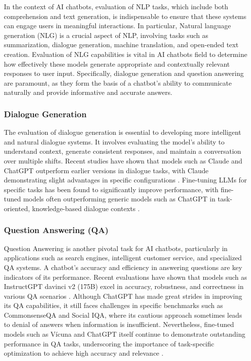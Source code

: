 In the context of AI chatbots, evaluation of NLP tasks, which include both comprehension and text generation, is indispensable to ensure that these systems can engage users in meaningful interactions. In particular, Natural language generation (NLG) is a crucial aspect of NLP, involving tasks such as summarization, dialogue generation, machine translation, and open-ended text creation. Evaluation of NLG capabilities is vital in AI chatbots field to determine how effectively these models generate appropriate and contextually relevant responses to user input. Specifically, dialogue generation and question answering are paramount, as they form the basis of a chatbot's ability to communicate naturally and provide informative and accurate answers.

\subsubsection{Dialogue Generation}

The evaluation of dialogue generation is essential to developing more intelligent and natural dialogue systems. It involves evaluating the model's ability to understand context, generate consistent responses, and maintain a conversation over multiple shifts. Recent studies have shown that models such as Claude and ChatGPT outperform earlier versions in dialogue tasks, with Claude demonstrating slight advantages in specific configurations \cite{lin2023llm, qin2023chatgpt}. Fine-tuning LLMs for specific tasks has been found to significantly improve performance, with fine-tuned models often outperforming generic models such as ChatGPT in task-oriented, knowledge-based dialogue contexts \cite{bang2023multitask}.

\subsubsection{Question Answering (QA)}

Question Answering is another pivotal task for AI chatbots, particularly in applications such as search engines, intelligent customer service, and specialized QA systems. A chatbot's accuracy and efficiency in answering questions are key indicators of its performance. Recent evaluations have shown that models such as InstructGPT davinci v2 (175B) excel in accuracy, robustness, and correctness in various QA scenarios \cite{ouyang2022training, liang2022holistic}. Although ChatGPT has made great strides in improving its QA capabilities, it still faces challenges in specific benchmarks such as CommonsenseQA and Social IQA, where its cautious approach sometimes leads to denial of answers when information is insufficient. Nevertheless, fine-tuned models such as Vícuna and ChatGPT itself continue to demonstrate outstanding performance in QA tasks, underscoring the importance of task-specific optimization to achieve high accuracy and relevance \cite{bai2024benchmarking}.

